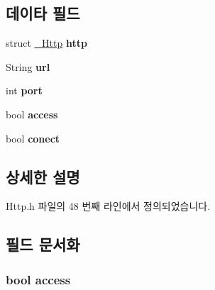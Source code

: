 \subsection*{데이타 필드}
\begin{DoxyCompactItemize}
\item 
\hypertarget{struct_http_extends_aac2793927d10867bce5b93fe1116b97b}{struct \hyperlink{struct___http}{\-\_\-\-Http} {\bfseries http}}\label{struct_http_extends_aac2793927d10867bce5b93fe1116b97b}

\item 
\hypertarget{struct_http_extends_a983d3a00cb7e2cdac046d6ef1ce9f8f2}{String {\bfseries url}}\label{struct_http_extends_a983d3a00cb7e2cdac046d6ef1ce9f8f2}

\item 
\hypertarget{struct_http_extends_a63c89c04d1feae07ca35558055155ffb}{int {\bfseries port}}\label{struct_http_extends_a63c89c04d1feae07ca35558055155ffb}

\item 
\hypertarget{struct_http_extends_ab4e2372937bb1eec89f2a954a4db6604}{bool {\bfseries access}}\label{struct_http_extends_ab4e2372937bb1eec89f2a954a4db6604}

\item 
\hypertarget{struct_http_extends_a506634736b4585cbeac7cbdefec1e540}{bool {\bfseries conect}}\label{struct_http_extends_a506634736b4585cbeac7cbdefec1e540}

\end{DoxyCompactItemize}


\subsection{상세한 설명}


Http.\-h 파일의 48 번째 라인에서 정의되었습니다.



\subsection{필드 문서화}
\hypertarget{struct_http_extends_ab4e2372937bb1eec89f2a954a4db6604}{
\subsubsection[{access}]{\setlength{\rightskip}{0pt plus 5cm}bool access}}\label{struct_http_extends_ab4e2372937bb1eec89f2a954a4db6604}


